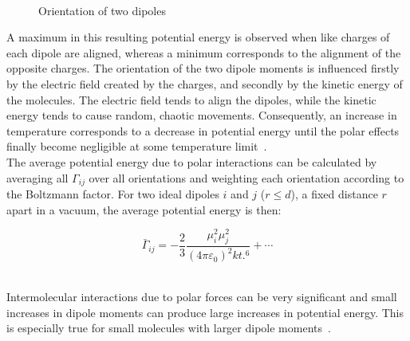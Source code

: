 \begin{figure}
\begin{center}
\resizebox{0.8\textwidth}{!}{}\\
\end{center}
\caption{Orientation of two dipoles } \label{DipoleDrawing}
\end{figure}

A maximum in this resulting potential energy is observed when like charges of each dipole are aligned, whereas a minimum corresponds to the alignment of the opposite charges. The orientation of the two dipole moments is influenced firstly by the electric field created by the charges, and secondly by the kinetic energy of the molecules. The electric field tends to align the dipoles, while the kinetic energy tends to cause random, chaotic movements. Consequently, an increase in temperature corresponds to a decrease in potential energy until the polar effects finally become negligible at some temperature limit~\cite{MolecularThermodynamicsOfFluidPhaseEquilibria}.\\

The average potential energy due to polar interactions can be calculated by averaging all $\Gamma_{ij}$ over all orientations and weighting each orientation according to the Boltzmann factor. For two ideal dipoles $i$ and $j$ ($r \le d$), a fixed distance $r$ apart in a vacuum, the average potential energy is then:~\cite{MolecularThermodynamicsOfFluidPhaseEquilibria}\

\begin{equation}
\bar{\Gamma}_{ij} = -\frac{2}{3}\frac{\mu_{i}^{2}\mu_{j}^{2}}{\left(4 \pi \varepsilon_{0}\right)^{2}kt.^{6}}+\cdots \label{Dipole Potential Average}
\end{equation}\


Intermolecular interactions due to polar forces can be very significant and small increases in dipole moments can produce large increases in potential energy. This is especially true for small molecules with larger dipole moments~\cite{MolecularThermodynamicsOfFluidPhaseEquilibria}.\\

